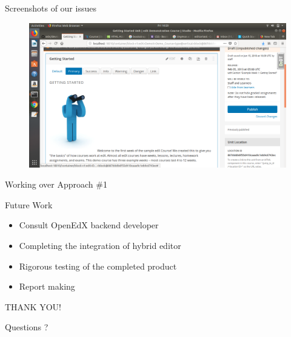 \documentclass{beamer}
\begin{document}
	\begin{frame}{Screenshots of our issues}
		\begin{figure}
			\includegraphics[width=\linewidth,height=\textheight,keepaspectratio]{./18-06-18/issue-3.png}
		\end{figure}
	\end{frame}
	
	\begin{frame}{Working over Approach \#1}
		\begin{block}{Future Work}
			\begin{itemize}
				\item Consult OpenEdX backend developer
				\item Completing the integration of hybrid editor
				\item Rigorous testing of the completed product
				\item Report making
			\end{itemize}
		\end{block}
	\end{frame}
	
	\begin{frame}
		THANK YOU!
	\end{frame}
	
	\begin{frame}
		Questions ?
	\end{frame}
\end{document}
